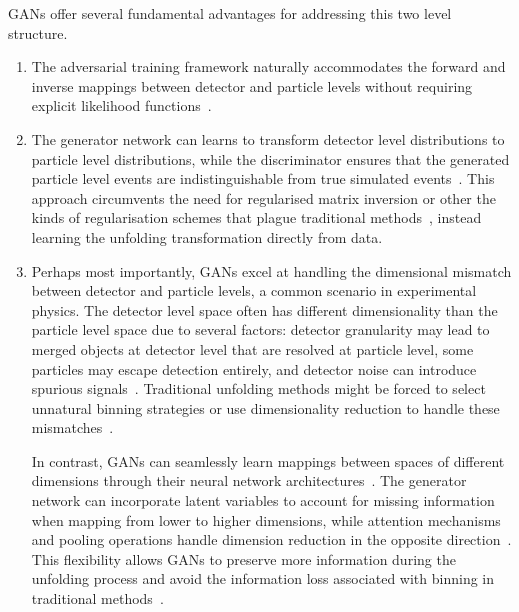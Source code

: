                 GANs offer several fundamental advantages for addressing this two level structure.
                \begin{enumerate}
                    \item The adversarial training framework naturally accommodates the forward and inverse mappings between detector and particle levels without requiring explicit likelihood functions~\cite{datta_unfolding_2018, hashemi_deep_2024, bellagente_how_2020}.
                    \item The generator network can learns to transform detector level distributions to particle level distributions, while the discriminator ensures that the generated particle level events are indistinguishable from true simulated events~\cite{erdmann_generating_2018}.
                    This approach circumvents the need for regularised matrix inversion or other the kinds of regularisation schemes that plague traditional methods~\cite{Girosi1995RegularizationArchitectures, Santos2022AvoidingNetworks}, instead learning the unfolding transformation directly from data.
                
                    \item Perhaps most importantly, GANs excel at handling the dimensional mismatch between detector and particle levels, a common scenario in experimental physics.
                    The detector level space often has different dimensionality than the particle level space due to several factors: detector granularity may lead to merged objects at detector level that are resolved at particle level, some particles may escape detection entirely, and detector noise can introduce spurious signals~\cite{komiske_preserving_2021, andreassen_omnifold_2020}.
                    Traditional unfolding methods might be forced to select unnatural binning strategies or use dimensionality reduction to handle these mismatches~\cite{schmitt_tunfold_2012}.
                    
                    In contrast, GANs can seamlessly learn mappings between spaces of different dimensions through their neural network architectures~\cite{bellagente_how_2020}.
                    The generator network can incorporate latent variables to account for missing information when mapping from lower to higher dimensions, while attention mechanisms and pooling operations handle dimension reduction in the opposite direction~\cite{datta_unfolding_2018,Erdmann_2019}. This flexibility allows GANs to preserve more information during the unfolding process and avoid the information loss associated with binning in traditional methods~\cite{andreassen_omnifold_2020}.
                \end{enumerate}

